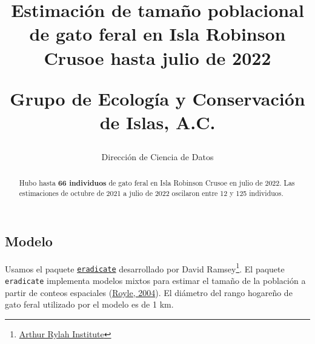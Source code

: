 \documentclass{article} %
\author{Dirección de Ciencia de Datos}
\title{Estimación de tamaño poblacional de gato feral en Isla Robinson Crusoe hasta julio de 2022\\ \begin{large} Grupo de Ecología y Conservación de Islas, A.C. \end{large}}
\begin{document}
\maketitle

\begin{abstract}
  Hubo hasta \textbf{66 individuos} de gato feral en Isla Robinson Crusoe en julio de 2022.
  Las estimaciones de octubre de 2021 a julio de 2022 oscilaron entre 12 y 125 individuos.
\end{abstract}

\begin{parcolumns}{2}
\end{parcolumns}

\subsection*{Modelo}
Usamos el paquete \href{https://github.com/eradicate-dev/eradicate}{\texttt{eradicate}} desarrollado por David Ramsey\footnote{\href{https://www.ari.vic.gov.au/about-us/staff}{Arthur Rylah Institute}}. 
El paquete \texttt{eradicate} implementa modelos mixtos para estimar el tamaño de la población a partir de conteos espaciales
 ({\href{https://onlinelibrary.wiley.com/doi/10.1111/j.0006-341X.2004.00142.x}{Royle, 2004}}).
El diámetro del rango hogareño de gato feral utilizado por el modelo es de 1 km.
\end{document}
